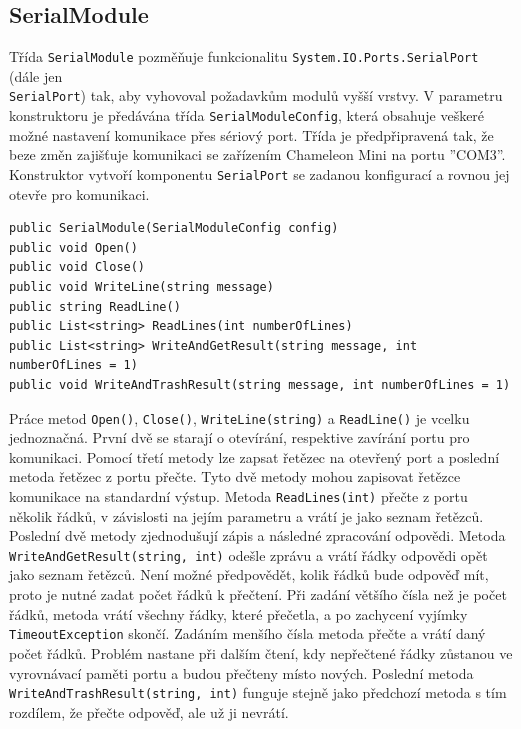 \subsection*{SerialModule}
Třída \verb|SerialModule| pozměňuje funkcionalitu \verb|System.IO.Ports.SerialPort| (dále jen \\\verb|SerialPort|) tak, aby vyhovoval požadavkům modulů vyšší vrstvy. V parametru konstruktoru je předávána třída \verb|SerialModuleConfig|, která obsahuje veškeré možné nastavení komunikace přes sériový port. Třída je předpřipravená tak, že beze změn zajišťuje komunikaci se zařízením Chameleon Mini na portu ''COM3''. Konstruktor vytvoří komponentu \verb|SerialPort| se zadanou konfigurací a rovnou jej otevře pro komunikaci.

\begin{lstlisting}[caption=Metody třídy \emph{SerialModule}, label={serialModuleMethods}]
public SerialModule(SerialModuleConfig config)
public void Open()
public void Close()
public void WriteLine(string message)
public string ReadLine()
public List<string> ReadLines(int numberOfLines)
public List<string> WriteAndGetResult(string message, int numberOfLines = 1)
public void WriteAndTrashResult(string message, int numberOfLines = 1)
\end{lstlisting}

Práce metod \verb|Open()|, \verb|Close()|, \verb|WriteLine(string)| a \verb|ReadLine()| je vcelku jednoznačná. První dvě se starají o otevírání, respektive zavírání portu pro komunikaci. Pomocí třetí metody lze zapsat řetězec na otevřený port a poslední metoda řetězec z portu přečte. Tyto dvě metody mohou zapisovat řetězce komunikace na standardní výstup. Metoda \verb|ReadLines(int)| přečte z portu několik řádků, v závislosti na jejím parametru a vrátí je jako seznam řetězců. Poslední dvě metody zjednodušují zápis a následné zpracování odpovědi. Metoda \verb|WriteAndGetResult(string, int)| odešle zprávu a vrátí řádky odpovědi opět jako seznam řetězců. Není možné předpovědět, kolik řádků bude odpověď mít, proto je nutné zadat počet řádků k přečtení. Při zadání většího čísla než je počet řádků, metoda vrátí všechny řádky, které přečetla, a po zachycení vyjímky \verb|TimeoutException| skončí. Zadáním menšího čísla metoda přečte a vrátí daný počet řádků. Problém nastane při dalším čtení, kdy nepřečtené řádky zůstanou ve vyrovnávací paměti portu a budou přečteny místo nových. Poslední metoda \verb|WriteAndTrashResult(string, int)| funguje stejně jako předchozí metoda s tím rozdílem, že přečte odpověď, ale už ji nevrátí.

